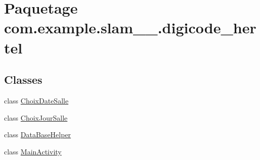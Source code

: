 \hypertarget{namespacecom_1_1example_1_1slam__2017__17_1_1digicode__hertel}{}\section{Paquetage com.\+example.\+slam\+\_\+\_.\+digicode\+\_\+hertel}
\label{namespacecom_1_1example_1_1slam__2017__17_1_1digicode__hertel}
\subsection*{Classes}
\begin{DoxyCompactItemize}
\item 
class \hyperlink{classcom_1_1example_1_1slam__2017__17_1_1digicode__hertel_1_1_choix_date_salle}{Choix\+Date\+Salle}
\item 
class \hyperlink{classcom_1_1example_1_1slam__2017__17_1_1digicode__hertel_1_1_choix_jour_salle}{Choix\+Jour\+Salle}
\item 
class \hyperlink{classcom_1_1example_1_1slam__2017__17_1_1digicode__hertel_1_1_data_base_helper}{Data\+Base\+Helper}
\item 
class \hyperlink{classcom_1_1example_1_1slam__2017__17_1_1digicode__hertel_1_1_main_activity}{Main\+Activity}
\end{DoxyCompactItemize}
